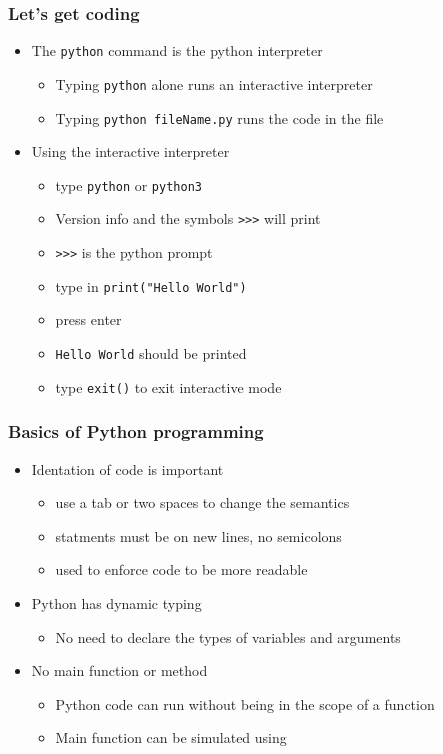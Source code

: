 \documentclass{beamer}
\begin{document}
\begin{frame}
  \frametitle{Let's get coding}
  \begin{itemize}
    \item The \texttt{python} command is the python interpreter
      \begin{itemize}
        \item Typing \texttt{python} alone runs an interactive interpreter
        \item Typing \texttt{python fileName.py} runs the code in the file
      \end{itemize}
    \item Using the interactive interpreter
      \begin{itemize}
        \item type \texttt{python} or \texttt{python3}
        \item Version info and the symbols \texttt{>>>} will print
        \item \texttt{>>>} is the python prompt
        \item type in \texttt{print("Hello World")}
        \item press enter
        \item \texttt{Hello World} should be printed
        \item type \texttt{exit()} to exit interactive mode
      \end{itemize}
  \end{itemize}
\end{frame}
\begin{frame}
  \frametitle{Basics of Python programming}
  \begin{itemize}
    \item Identation of code is important
      \begin{itemize}
        \item use a tab or two spaces to change the semantics
        \item statments must be on new lines, no semicolons
        \item used to enforce code to be more readable
      \end{itemize}
    \item Python has dynamic typing
      \begin{itemize}
        \item No need to declare the types of variables and arguments
      \end{itemize}
    \item No main function or method
      \begin{itemize}
        \item Python code can run without being in the scope of a function
        \item Main function can be simulated using
          
      \end{itemize}
  \end{itemize}
\end{frame}
\end{document}
